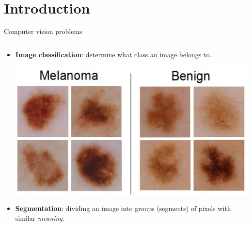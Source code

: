 \documentclass[9pt, aspectratio=169]{beamer}
\begin{document}
\section{Introduction}

\begin{frame}
    {Computer vision problems}
    \begin{columns}[t]
        \begin{column}{.5\textwidth}
            \begin{itemize}
                \item \textbf{Image classification}: determine what class an image belongs to.

                      \centering
                      \includegraphics[width=.6\textwidth]{ISIC_melanoma.jpg}
                      \pause
                \item \raggedright \textbf{Segmentation}: dividing an image into groups (segments) of pixels with similar \textit{meaning}.


\end{itemize}
\end{column}
\end{columns}
\end{frame}
\end{document}
